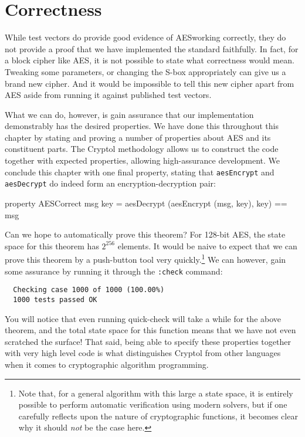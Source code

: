 \section{Correctness}
\label{sec:aescorrectattempt}

While test vectors do provide good evidence of AES\indAES working
correctly, they do not provide a proof that we have implemented the
standard faithfully. In fact, for a block cipher like AES, it is not
possible to state what correctness would mean.  Tweaking some
parameters, or changing the S-box appropriately can give us a brand
new cipher.  And it would be impossible to tell this new cipher apart
from AES aside from running it against published test vectors.


What we can do, however, is gain assurance that our implementation
demonstrably has the desired properties. We have done this throughout
this chapter by stating and proving a number of properties about AES
and its constituent parts. The Cryptol methodology allows us to
construct the code together with expected properties, allowing
high-assurance development. We conclude this chapter with one final
property, stating that {\tt aesEncrypt} and {\tt aesDecrypt} do indeed
form an encryption-decryption pair:

\begin{code}
  property AESCorrect msg key = aesDecrypt (aesEncrypt (msg, key), key) == msg
\end{code}

Can we hope to automatically prove this theorem?  For 128-bit AES, the
state space for this theorem has $2^{256}$ elements.  It would be
naive to expect that we can prove this theorem by a push-button tool
very quickly.\footnote{Note that, for a general algorithm with this
  large a state space, it is entirely possible to perform automatic
  verification using modern solvers, but if one carefully reflects
  upon the nature of cryptographic functions, it becomes clear why it
  should \emph{not} be the case here.}  We can however, gain some
assurance by running it through the {\tt :check} command:\indCmdCheck

\begin{Verbatim}
  Checking case 1000 of 1000 (100.00%) 
  1000 tests passed OK
\end{Verbatim}
You will notice that even running quick-check will take a while for
the above theorem, and the total state space for this function means
that we have not even scratched the surface! That said, being able to
specify these properties together with very high level code is what
distinguishes Cryptol from other languages when it comes to
cryptographic algorithm programming.

